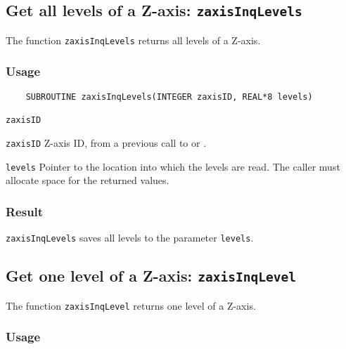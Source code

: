 \subsection{Get all levels of a Z-axis: \texttt{zaxisInqLevels}}
\label{zaxisInqLevels}

The function {\texttt{zaxisInqLevels}} returns all levels of a Z-axis.

\subsubsection*{Usage}

\begin{verbatim}
    SUBROUTINE zaxisInqLevels(INTEGER zaxisID, REAL*8 levels)
\end{verbatim}

\hspace*{4mm}\begin{minipage}[]{15cm}
\begin{deflist}{\texttt{zaxisID}\ }
\item[\texttt{zaxisID}]
Z-axis ID, from a previous call to {} or {}.
\item[\texttt{levels}]
Pointer to the location into which the levels are read.
                    The caller must allocate space for the returned values.

\end{deflist}
\end{minipage}

\subsubsection*{Result}

{\texttt{zaxisInqLevels}} saves all levels to the parameter {\texttt{levels}}.


\subsection{Get one level of a Z-axis: \texttt{zaxisInqLevel}}
\label{zaxisInqLevel}

The function {\texttt{zaxisInqLevel}} returns one level of a Z-axis.

\subsubsection*{Usage}

